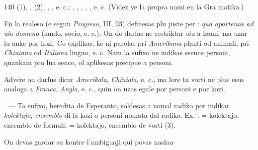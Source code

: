 \begin{VUpage}[144]{140}
\VUcontinue
{} (1), ,  (2), ,\nl
{}, e. c.; , , , \cc
{}, , e. c. (Videz ye la propra nomi en la Gra\cc
matiko.)

En la realeso (e segun \textit{Progreso}, III, 93)  definesas\nl
plu juste per : \textit{qua apartenas ad ula domeno} (lando, socio,\nl
e. c.). On do darfas ne restriktar olu a homi, ma uzar lu\nl
anke por kozi. Co explikas, ke ni parolas pri \textit{Amerikana}\nl
planti od animali, pri \textit{Chiniana} od \textit{Italiana} linguo, e. c. Nam\nl
la sufixo  ne indikas esence personi, quankam pro lua\nl
senco, ol aplikesas precipue a personi.

Advere on darfus dicar \textit{Amerikala}, \textit{Chiniala}, e. c., ma lore\nl
ta vorti ne plus esus analoga a \textit{Franca}, \textit{Angla}, e. c., quin on\nl
uzas egale por personi e por kozi.

. --- Ta sufixo, heredita de Esperanto, soldesas a nomal\nl
radiko por indikar \textit{kolektajo}, \textit{ensemblo} di la kozi o personi\nl
nomata dal radiko. Ex. :  = kolektajo, ensemblo\nl
de formuli;  = kolektajo, ensemblo de vorti (3).

On devas gardar su kontre l'ambiguaji qui povas naskar\parplein
\end{VUpage}

